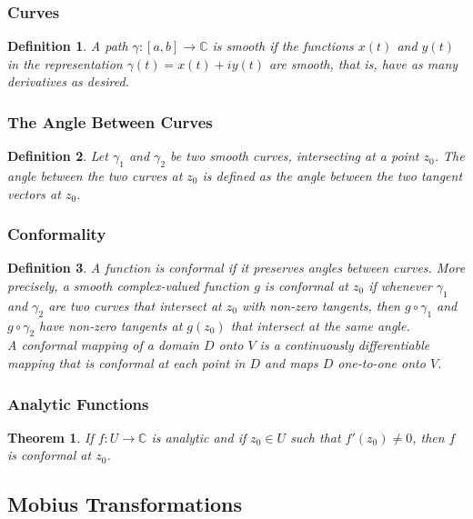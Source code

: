 \documentclass{article}
\newtheorem{theorem}{Theorem}[section]
\newtheorem{definition}{Definition}[section]
\begin{document}
\subsubsection{Curves}
\begin{definition}
A path $\gamma : [a, b] \to \mathbb{C}$ is smooth if the functions $x(t)$ and $y(t)$ in the representation $\gamma (t) = x(t) + iy(t)$ are smooth, that is, have as many derivatives as desired.
\end{definition}

\subsubsection{The Angle Between Curves}
\begin{definition}
Let $\gamma_1$ and $\gamma_2$ be two smooth curves, intersecting at a point $z_0$. The angle between the two curves at $z_0$ is defined as the angle between the two tangent vectors at $z_0$.
\end{definition}

\subsubsection{Conformality}
\begin{definition}
A function is conformal if it preserves angles between curves. More precisely, a smooth complex-valued function $g$ is conformal at $z_0$ if whenever $\gamma_1$ and $\gamma_2$ are two curves that intersect at $z_0$ with non-zero tangents, then $g \circ \gamma_1$ and $g \circ \gamma_2$ have non-zero tangents at $g(z_0)$ that intersect at the same angle.\\
A conformal mapping of a domain $D$ onto $V$ is a continuously differentiable mapping that is conformal at each point in $D$ and maps $D$ one-to-one onto $V$.
\end{definition}

\subsubsection{Analytic Functions}
\begin{theorem}
If $f : U \to \mathbb{C}$ is analytic and if $z_0 \in U$ such that $f'(z_0) \neq 0$, then $f$ is conformal at $z_0$.
\end{theorem}

\subsection{Mobius Transformations}
\end{document}
